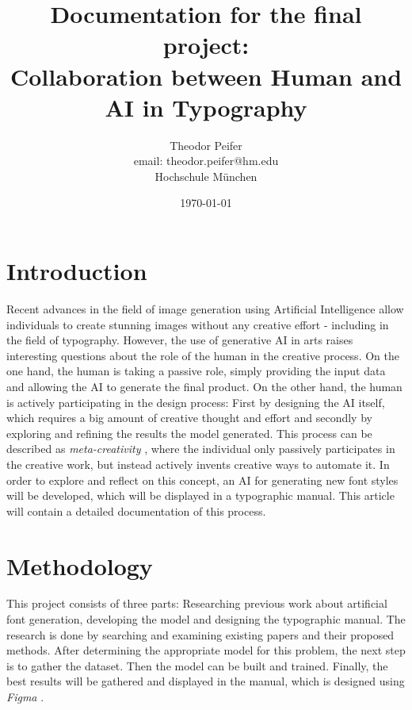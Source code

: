 \documentclass[11pt]{article}
\title{\textbf{Documentation for the final project: \\ Collaboration between Human and AI in Typography}}
\author{Theodor Peifer \\ email: theodor.peifer@hm.edu \\ Hochschule München}
\date{\today}
\begin{document}
\maketitle

\pagebreak

\section{Introduction}
Recent advances in the field of image generation using Artificial Intelligence allow individuals to create stunning images without any creative effort - including in the field of typography.
However, the use of generative AI in arts raises interesting questions about the role of the human in the creative process. On the one hand, the human is taking a passive role, simply providing the input data and allowing the AI to generate the final product. On the other hand, the human is actively participating in the design process: First by designing the AI itself, which requires a big amount of creative thought and effort and secondly by exploring and refining the results the model generated.
This process can be described as \emph{meta-creativity} \cite{metaCreativity}, where the individual only passively participates in the creative work, but instead actively invents creative ways to automate it.
In order to explore and reflect on this concept, an AI for generating new font styles will be developed, which will be displayed in a typographic manual. This article will contain a detailed documentation of this process.


\section{Methodology}
This project consists of three parts: Researching previous work about artificial font generation, developing the model and designing the typographic manual.
The research is done by searching and examining existing papers and their proposed methods. After determining the appropriate model for this problem, the next step is to gather the dataset. Then the model can be built and trained. Finally, the best results will be gathered and displayed in the manual, which is designed using \emph{Figma} \cite{figmaUIDesignTool}.
\end{document}
